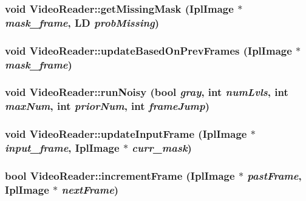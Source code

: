 \subsubsection{\setlength{\rightskip}{0pt plus 5cm}void VideoReader::getMissingMask (IplImage $\ast$ {\em mask\_\-frame}, {\bf LD} {\em probMissing})}\label{classVideoReader_75c6a8631b661dbd55caf2fe357ef8f6}


\subsubsection{\setlength{\rightskip}{0pt plus 5cm}void VideoReader::updateBasedOnPrevFrames (IplImage $\ast$ {\em mask\_\-frame})}\label{classVideoReader_ddda11180fc2782c117c30e289d93c2a}


\subsubsection{\setlength{\rightskip}{0pt plus 5cm}void VideoReader::runNoisy (bool {\em gray}, int {\em numLvls}, int {\em maxNum}, int {\em priorNum}, int {\em frameJump})}\label{classVideoReader_ffbcf0d37d2bb67edd64cb6317bf4e5b}


\subsubsection{\setlength{\rightskip}{0pt plus 5cm}void VideoReader::updateInputFrame (IplImage $\ast$ {\em input\_\-frame}, IplImage $\ast$ {\em curr\_\-mask})}\label{classVideoReader_00913618c64f5057770c195d72f7d45c}


\subsubsection{\setlength{\rightskip}{0pt plus 5cm}bool VideoReader::incrementFrame (IplImage $\ast$ {\em pastFrame}, IplImage $\ast$ {\em nextFrame})\hspace{0.3cm}{\tt  [inline]}}\label{classVideoReader_aa784ab08706bbaf9fa6bdfee0730c3d}


